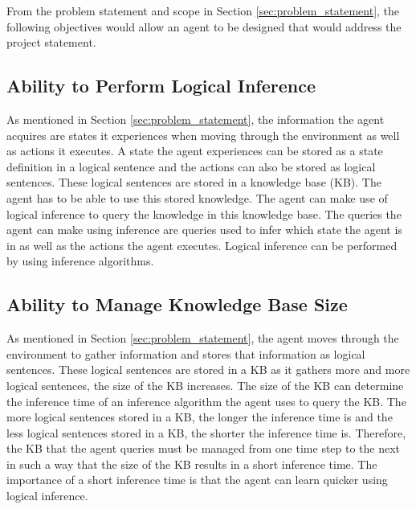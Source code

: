From the problem statement and scope in Section \ref{sec:problem_statement}, the following objectives would allow an agent to be designed that would address the project statement.





\subsection{Ability to Perform Logical Inference}

As mentioned in Section \ref{sec:problem_statement}, the information the agent acquires are states it experiences when moving through the environment as well as actions it executes. A state the agent experiences can be stored as a state definition in a logical sentence and the actions can also be stored as logical sentences. These logical sentences are stored in a knowledge base (KB). The agent has to be able to use this stored knowledge. The agent can make use of logical inference to query the knowledge in this knowledge base. The queries the agent can make using inference are queries used to infer which state the agent is in as well as the actions the agent executes. Logical inference can be performed by using inference algorithms.


\subsection{Ability to Manage Knowledge Base Size}

As mentioned in Section \ref{sec:problem_statement}, the agent moves through the environment to gather information and stores that information as logical sentences. These logical sentences are stored in a KB as it gathers more and more logical sentences, the size of the KB increases. The size of the KB can determine the inference time of an inference algorithm the agent uses to query the KB. The more logical sentences stored in a KB, the longer the inference time is and the less logical sentences stored in a KB, the shorter the inference time is. Therefore, the KB that the agent queries must be managed from one time step to the next in such a way that the size of the KB results in a short inference time. The importance of a short inference time is that the agent can learn quicker using logical inference. 

